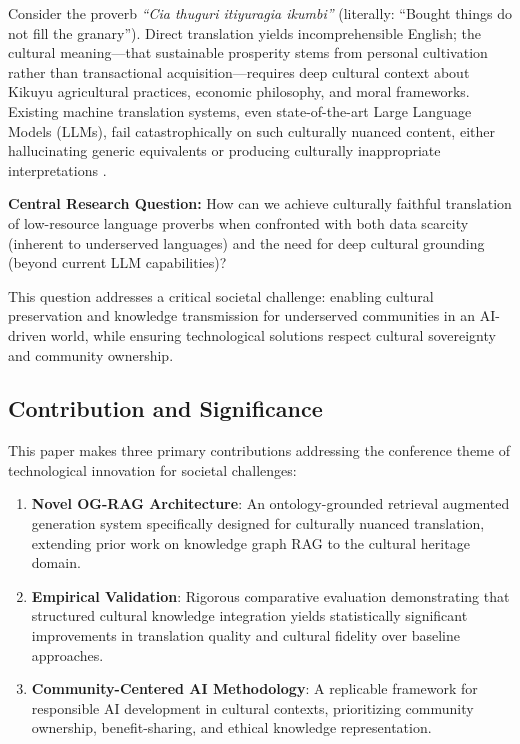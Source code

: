 \documentclass[a4paper,11pt]{article}
\begin{document}
Consider the proverb \emph{``Cia thuguri itiyuragia ikumbi''} (literally: ``Bought things do not fill the granary''). Direct translation yields incomprehensible English; the cultural meaning—that sustainable prosperity stems from personal cultivation rather than transactional acquisition—requires deep cultural context about Kikuyu agricultural practices, economic philosophy, and moral frameworks. Existing machine translation systems, even state-of-the-art Large Language Models (LLMs), fail catastrophically on such culturally nuanced content, either hallucinating generic equivalents or producing culturally inappropriate interpretations \cite{zhang2023siren}.

\textbf{Central Research Question:} How can we achieve culturally faithful translation of low-resource language proverbs when confronted with both data scarcity (inherent to underserved languages) and the need for deep cultural grounding (beyond current LLM capabilities)?

This question addresses a critical societal challenge: enabling cultural preservation and knowledge transmission for underserved communities in an AI-driven world, while ensuring technological solutions respect cultural sovereignty and community ownership.

\subsection{Contribution and Significance}

This paper makes three primary contributions addressing the conference theme of technological innovation for societal challenges:

\begin{enumerate}
    \item \textbf{Novel OG-RAG Architecture}: An ontology-grounded retrieval augmented generation system specifically designed for culturally nuanced translation, extending prior work on knowledge graph RAG \cite{edge2024local} to the cultural heritage domain.
    
    \item \textbf{Empirical Validation}: Rigorous comparative evaluation demonstrating that structured cultural knowledge integration yields statistically significant improvements in translation quality and cultural fidelity over baseline approaches.
    
    \item \textbf{Community-Centered AI Methodology}: A replicable framework for responsible AI development in cultural contexts, prioritizing community ownership, benefit-sharing, and ethical knowledge representation.
\end{enumerate}
\end{document}
